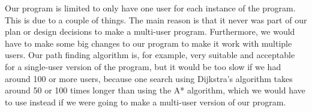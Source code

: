 Our program is limited to only have one user for each instance of the program. This is due to a couple of things. The main reason is that it never was part of our plan or design decisions to make a multi-user program. Furthermore, we would have to make some big changes to our program to make it work with multiple users. Our path finding algorithm is, for example, very suitable and acceptable for a single-user version of the program, but it would be too slow if we had around 100 or more users, because one search using Dijkstra's algorithm takes around 50 or 100 times longer than using the A* algorithm, which we would have to use instead if we were going to make a multi-user version of our program.
